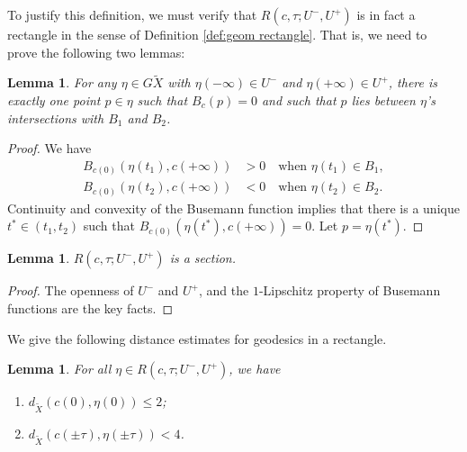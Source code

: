 \documentclass[10pt]{amsart}
\newtheorem{lem}[thm]{Lemma}
\theoremstyle{definition}
\numberwithin{equation}{section}
\begin{document}
To justify this definition, we must verify that $R(c, \tau; U^-, U^+)$ is in fact a rectangle in the sense of Definition \ref{def:geom rectangle}. That is, we need to prove the following two lemmas:

\begin{lem} \label{sectionproof}
For any $\eta \in G\tilde X$ with $\eta(-\infty) \in U^-$ and $\eta(+\infty) \in U^+$, there is exactly one point $p \in \eta$ such that $B_{c}(p)=0$ and such that $p$ lies between $\eta$'s intersections with $B_1$ and $B_2$.
\end{lem}

\begin{proof}
We have
\begin{align*}
B_{c(0)}(\eta(t_1),c(+\infty))&>0\quad \text{when }\eta(t_1)\in B_1,\\
B_{c(0)}(\eta(t_2),c(+\infty))&<0\quad \text{when }\eta(t_2)\in B_2. 
\end{align*}
Continuity and convexity of the Busemann function implies that there is a unique $t^*\in (t_1, t_2)$ such that $B_{c(0)}(\eta(t^*),c(+\infty))=0$. Let $p=\eta(t^*)$.
\end{proof}
\begin{lem}
$R(c, \tau; U^-, U^+)$ is a section.
\end{lem}
\begin{proof}
The openness of $U^-$ and $U^+$, and the $1$-Lipschitz property of Busemann functions are the key facts.
\end{proof}

We give the following distance estimates for geodesics in a rectangle.

\begin{lem} \label{l.distance}
For all $\eta \in R(c, \tau; U^-, U^+)$, we have
\begin{enumerate}
\item\label{l.distance1} $d_{\tilde X}(c(0), \eta(0))\leq 2$;
\item\label{l.distance2} $d_{\tilde X}(c( \pm \tau), \eta(\pm \tau))<4$.
\end{enumerate}
\end{lem}
\end{document}
